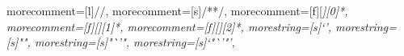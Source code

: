 {    %
    morecomment=[l]{//},
    morecomment=[s]{/*}{*/},
    morecomment=[f][\itshape\color{gray}][0]{*}, %
    morecomment=[f][\itshape\color{gray}][1]{*}, %
    morecomment=[f][\itshape\color{gray}][2]{*}, %
    morestring=[s]{`}{'},
    morestring=[s]{"}{"},
    morestring=[s]{"`}{'"},
    morestring=[s]{`"`}{'"'},
}
